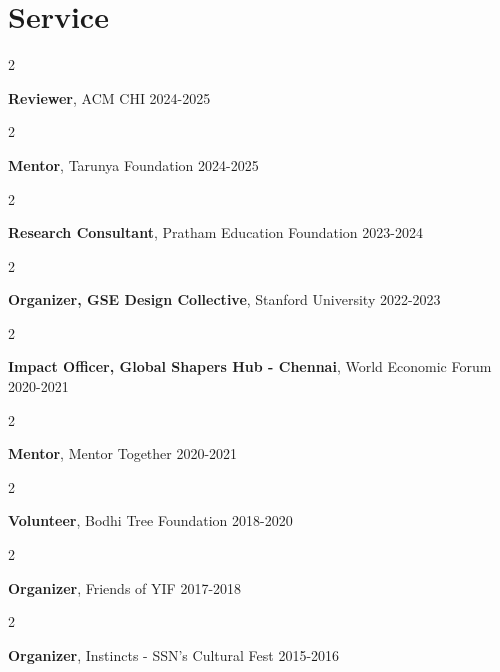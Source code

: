 \documentclass[10pt, letterpaper]{article}
\newenvironment{twocolentry}[2][]{
    \onecolentry
    \def\secondColumn{#2}
    \setcolumnwidth{\fill, 4.5 cm}
    \begin{paracol}{2}
}{
    \switchcolumn \raggedleft \secondColumn
    \end{paracol}
    \endonecolentry
} %
\newcommand{\datetext}[1]{\color{gray800}#1}
\newcommand{\serviceentry}[3]{
    \begin{twocolentry}{
        \datetext{#3}
    }
        \textbf{#1}, #2\end{twocolentry}

    \vspace{0.10 cm}
}
\begin{document}
    \section{Service}

        \serviceentry{Reviewer}{ACM CHI}{2024-2025}
        \serviceentry{Mentor}{Tarunya Foundation}{2024-2025}
        \serviceentry{Research Consultant}{Pratham Education Foundation}{2023-2024}
        \serviceentry{Organizer, GSE Design Collective}{Stanford University}{2022-2023}
        \serviceentry{Impact Officer, Global Shapers Hub - Chennai}{World Economic Forum}{2020-2021}
        \serviceentry{Mentor}{Mentor Together}{2020-2021}
        \serviceentry{Volunteer}{Bodhi Tree Foundation}{2018-2020}
        \serviceentry{Organizer}{Friends of YIF}{2017-2018}
        \serviceentry{Organizer}{Instincts - SSN's Cultural Fest}{2015-2016}


    


    
\end{document}
